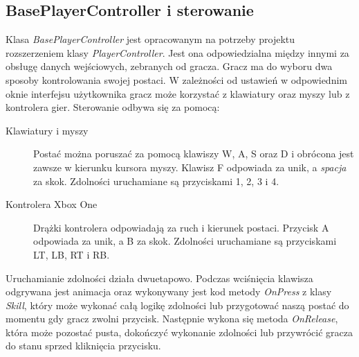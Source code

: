 \documentclass[multip]{SGGW-thesis}
\begin{document}
	\subsection{BasePlayerController i sterowanie}
	Klasa  {\em BasePlayerController} jest opracowanym na potrzeby projektu rozszerzeniem klasy  {\em PlayerController}. Jest ona odpowiedzialna między innymi za obsługę danych wejściowych, zebranych od gracza. 
Gracz ma do wyboru dwa sposoby kontrolowania swojej postaci. W zależności od ustawień w odpowiednim oknie interfejsu użytkownika gracz może korzystać z klawiatury oraz myszy lub z kontrolera gier. Sterowanie odbywa się za pomocą:
\begin{description}
\item[Klawiatury i myszy]
Postać można poruszać za pomocą klawiszy W, A, S oraz D i obrócona jest zawsze w kierunku kursora myszy. Klawisz F odpowiada za unik, a {\em spacja} za skok. Zdolności uruchamiane są przyciskami 1, 2, 3 i 4.
\item[Kontrolera Xbox One]
Drążki kontrolera odpowiadają za ruch i kierunek postaci. Przycisk A odpowiada za unik, a B za skok. Zdolności uruchamiane są przyciskami LT, LB, RT i RB.
\end{description}
Uruchamianie zdolności działa dwuetapowo. Podczas wciśnięcia klawisza odgrywana jest animacja oraz wykonywany jest kod metody {\em OnPress} z klasy {\em Skill}, który może wykonać całą logikę zdolności lub przygotować naszą postać do momentu gdy gracz zwolni przycisk. Następnie wykona się metoda {\em OnRelease}, która może pozostać pusta, dokończyć wykonanie zdolności lub przywrócić gracza do stanu sprzed kliknięcia przycisku.
\end{document}
